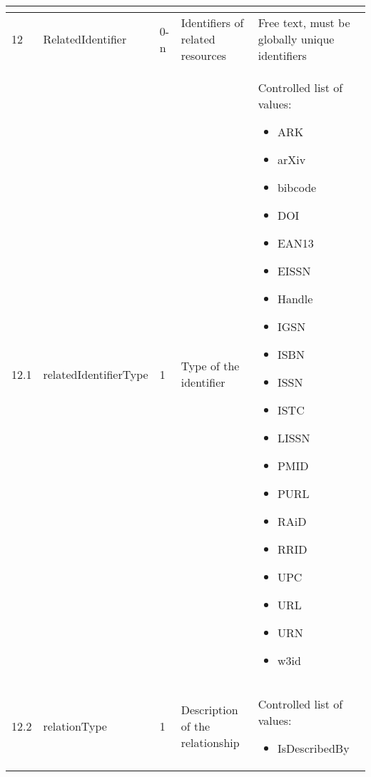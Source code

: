 \documentclass[titlepage=true,twoside=false,DIV=13]{scrartcl}
\begin{document}
\begin{longtable}{|l|l|l|p{}|p{\valcolw}|}
\begin{minipage}[t]{\valcolw}
\begin{itemize}[nosep,leftmargin=3.5ex]
            \end{itemize}
            \vspace{1ex}
          \end{minipage} \\
  \hline
  12    & RelatedIdentifier            & 0-n
        & Identifiers of related resources
        & Free text, must be globally unique identifiers \\
  \hline
  12.1  & relatedIdentifierType        & 1
        & Type of the identifier
        & \begin{minipage}[t]{\valcolw}
            Controlled list of values:
            \begin{itemize}[nosep,leftmargin=3.5ex]
            \item ARK
            \item arXiv
            \item bibcode
            \item DOI
            \item EAN13
            \item EISSN
            \item Handle
            \item IGSN
            \item ISBN
            \item  ISSN
            \item ISTC
            \item LISSN
            \item PMID
            \item PURL
            \item RAiD
            \item RRID
            \item UPC
            \item URL
            \item URN
            \item w3id
            \end{itemize}
            \vspace{1ex}
          \end{minipage} \\
  \hline
  12.2  & relationType                 & 1
        & Description of the relationship
        & \begin{minipage}[t]{\valcolw}
            Controlled list of values:
            \begin{itemize}[nosep,leftmargin=3.5ex]
            \item IsDescribedBy

\end{itemize}
\end{minipage}
\end{longtable}
\end{document}
